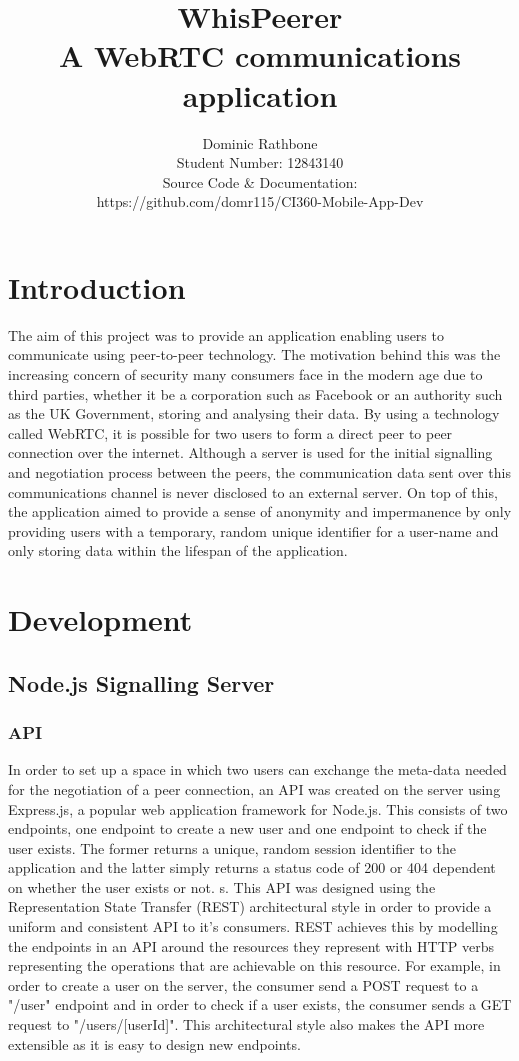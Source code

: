 \documentclass[]{report}
\title{WhisPeerer \\A WebRTC communications application}
\author{Dominic Rathbone \\ Student Number: 12843140 \\ Source Code \& Documentation: \\ https://github.com/domr115/CI360-Mobile-App-Dev}
\begin{document}
\maketitle

\tableofcontents

\chapter{Introduction}
The aim of this project was to provide an application enabling users to communicate using peer-to-peer technology. The motivation behind this was the increasing concern of security many consumers face in the modern age due to third parties, whether it be a corporation such as Facebook or an authority such as the UK Government, storing and analysing their data. By using a technology called WebRTC, it is possible for two users to form a direct peer to peer connection over the internet.  Although a server is used for the initial signalling and negotiation process between the peers, the communication data sent over this communications channel is never disclosed to an external server. On top of this, the application aimed to provide a sense of anonymity and impermanence by only providing users with a temporary, random unique identifier for a user-name and only storing data within the lifespan of the application.

\chapter{Development}
	\section{Node.js Signalling Server}
		\subsection{API}
		In order to set up a space in which two users can exchange the meta-data needed for the negotiation of a peer connection, an API was created on the server using Express.js, a popular web application framework for Node.js. This consists of two endpoints, one endpoint to create a new user and one endpoint to check if the user exists. The former returns a unique, random session identifier to the application and the latter simply returns a status code of 200 or 404 dependent on whether the user exists or not. s. This API was designed using the Representation State Transfer (REST) architectural style in order to provide a uniform and consistent API to it's consumers. REST achieves this by modelling the endpoints in an API around the resources they represent with HTTP verbs representing the operations that are achievable on this resource. For example, in order to create a user on the server, the consumer send a POST request to a "/user" endpoint and in order to check if a user exists, the consumer sends a GET request to "/users/[userId]". This architectural style also makes the API more extensible as it is easy to design new endpoints.
		
\end{document}
